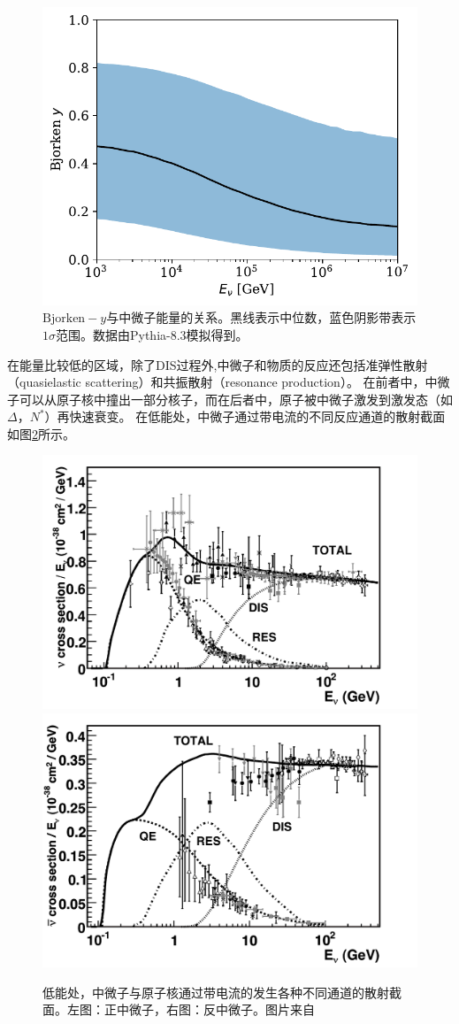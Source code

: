 \begin{figure}[htb]
    \centering
    \includegraphics[width=0.7\linewidth]{img/Bjorken_y.pdf}
    \caption{$\mathrm{Bjorken}-y$与中微子能量的关系。黑线表示中位数，蓝色阴影带表示$1\sigma$范围。数据由Pythia-8.3\cite{Pythia8.2:2014, Pythia8.3:2022}模拟得到。}
    \label{fig:Bjorken_y}
\end{figure}

在能量比较低的区域，除了DIS过程外,中微子和物质的反应还包括准弹性散射（quasielastic scattering）和共振散射（resonance  production）。
在前者中，中微子可以从原子核中撞出一部分核子，而在后者中，原子被中微子激发到激发态（如$\Delta$，$N^*$）再快速衰变\cite{CS_Formaggio:2012}。
在低能处，中微子通过带电流的不同反应通道的散射截面如图\ref{fig:DIS_cross_section_le}所示。

\begin{figure}[htb]
    \centering
    \includegraphics[width=0.45\linewidth]{img/cross_section_le_CC.pdf}
    \includegraphics[width=0.45\linewidth]{img/cross_section_le_CCbar.pdf}
    \caption{低能处，中微子与原子核通过带电流的发生各种不同通道的散射截面。左图：正中微子，右图：反中微子。图片来自\parencite{CS_Formaggio:2012}}
    \label{fig:DIS_cross_section_le}
\end{figure}




